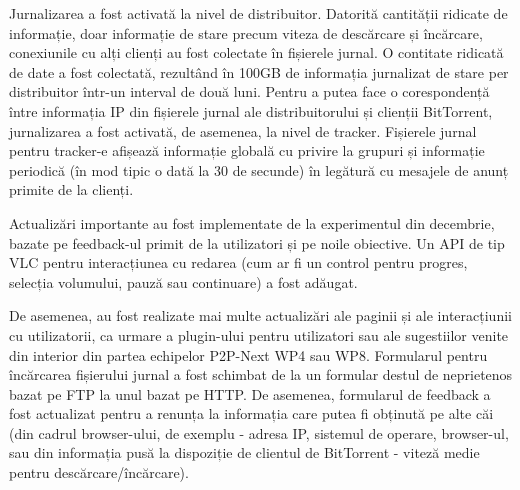 Jurnalizarea a fost activată la nivel de distribuitor. Datorită cantității ridicate de
informație, doar informație de stare precum viteza de descărcare și încărcare,
conexiunile cu alți clienți au fost colectate în fișierele jurnal. O contitate
ridicată de date a fost colectată, rezultând în 100GB de informația jurnalizat de stare
per distribuitor într-un interval de două luni. Pentru a putea face o corespondență
între informația IP din fișierele jurnal ale distribuitorului și clienții BitTorrent,
jurnalizarea a fost activată, de asemenea, la nivel de tracker. Fișierele
jurnal pentru
tracker-e afișează informație globală cu privire la grupuri și informație periodică
(în mod tipic o dată la 30 de secunde) în legătură cu mesajele de anunț primite de
la clienți.

Actualizări importante au fost implementate de la experimentul din decembrie,
bazate pe feedback-ul primit de la utilizatori și pe noile obiective. Un API de tip
VLC pentru interacțiunea cu redarea (cum ar fi un control pentru progres, selecția
volumului, pauză sau continuare) a fost adăugat.

De asemenea, au fost realizate mai multe actualizări ale paginii și ale
interacțiunii cu utilizatorii, ca urmare a plugin-ului pentru utilizatori sau
ale sugestiilor venite din interior din partea echipelor P2P-Next WP4 sau WP8.
Formularul pentru încărcarea fișierului jurnal a fost schimbat de la un formular
destul de neprietenos bazat pe FTP la unul bazat pe HTTP. De asemenea, formularul
de feedback a fost actualizat pentru a renunța la informația care putea fi obținută
pe alte căi (din cadrul browser-ului, de exemplu - adresa IP, sistemul de operare,
browser-ul, sau din informația pusă la dispoziție de clientul de BitTorrent -
viteză medie pentru descărcare/încărcare).

